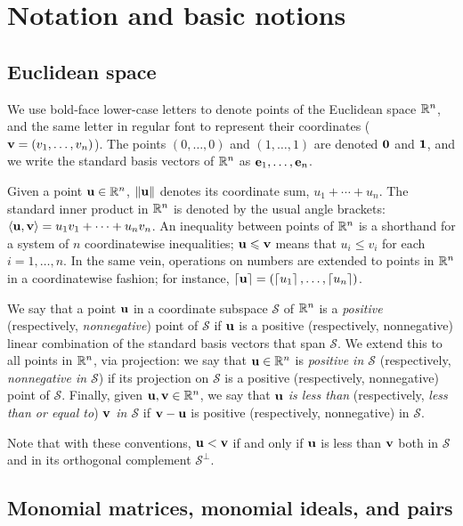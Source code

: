 \documentclass{amsart}
\begin{document}

\section{Notation and basic notions}

\subsection{Euclidean space}
\label{ss: euclidean spaces and convexity}
We use bold-face lower-case letters to denote points of the Euclidean space $\mathbb{R}^n$, and the same letter in regular font to represent their coordinates (\eg $\mathbf{v}=(v_1,\ldots,v_n)$).
The points $(0,\ldots,0)$ and $(1,\ldots,1)$ are denoted $\mathbf{0}$ and $\mathbf{1}$, and we write the standard basis vectors of $\mathbb{R}^n$ as $\mathbf{e}_1,\ldots,\mathbf{e}_n$.

Given a point $\mathbf{u}\in \mathbb{R}^n$, $\| \mathbf{u} \|$ denotes its coordinate sum, $u_1+\cdots+u_n$.
The standard inner product in $\mathbb{R}^n$ is denoted by the usual angle brackets: $\langle \mathbf{u}, \mathbf{v} \rangle = u_1v_1 + \cdots + u_nv_n$.
An inequality between points of $\mathbb{R}^n$ is a shorthand for a system of $n$ coordinatewise inequalities; \eg $\mathbf{u}\leqslant \mathbf{v}$ means that $u_i \le v_i$ for each $i=1,\ldots,n$.
In the same vein, operations on numbers are extended to points in $\mathbb{R}^n$ in a coordinatewise fashion; for instance, $\left\lceil \mathbf{u} \right\rceil=(\left\lceil u_1 \right\rceil,\ldots,\left\lceil u_n \right\rceil)$.

We say that a point $\mathbf{u}$ in a coordinate subspace $\mathcal{S}$ of $\mathbb{R}^n$ is a \emph{positive} (respectively, \emph{nonnegative}) point of $\mathcal{S}$ if $\mathbf{u}$ is a positive (respectively, nonnegative) linear combination of the standard basis vectors that span $\mathcal{S}$.
We extend this to all points in $\mathbb{R}^n$, via projection: we say that $\mathbf{u} \in \mathbb{R}^n$ is \emph{positive in $\mathcal{S}$} (respectively, \emph{nonnegative in $\mathcal{S}$}) if its projection on $\mathcal{S}$ is a positive (respectively, nonnegative) point of $\mathcal{S}$.
Finally, given $\mathbf{u},\mathbf{v}\in \mathbb{R}^n$, we say that \emph{$\mathbf{u}$ is less than} (respectively, \emph{less than or equal to}) \emph{$\mathbf{v}$ in $\mathcal{S}$} if $\mathbf{v}-\mathbf{u}$ is positive (respectively, nonnegative) in $\mathcal{S}$.

Note that with these conventions, $\mathbf{u} < \mathbf{v}$ if and only if $\mathbf{u}$ is less than $\mathbf{v}$ both in $\mathcal{S}$ and in its orthogonal complement $\mathcal{S}^\perp$.

\subsection{Monomial matrices, monomial ideals, and pairs}
\label{monomial newton preliminaries: ss}
\end{document}
